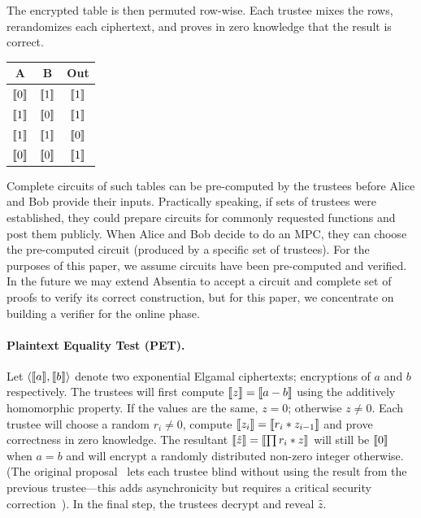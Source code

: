 The encrypted table is then permuted row-wise. Each trustee mixes the rows, rerandomizes each ciphertext, and proves in zero knowledge that the result is correct. 

\begin{center}
\begin{tabular}{|c|c|c|}
  \hline
  A			& 	B			& 	Out   			\\ \hline
  $\llbracket 0 \rrbracket$ 	&	$\llbracket 1 \rrbracket$ 	& 	$\llbracket 1 \rrbracket$ 	\\ \hline
  $\llbracket 1 \rrbracket$ 	&	$\llbracket 0 \rrbracket$ 	&  	$\llbracket 1 \rrbracket$ 	\\ \hline
  $\llbracket 1 \rrbracket$ 	&	$\llbracket 1 \rrbracket$ 	&  	$\llbracket 0 \rrbracket$ 	\\ \hline
  $\llbracket 0 \rrbracket$ 	&	$\llbracket 0 \rrbracket$ 	& 	$\llbracket 1 \rrbracket$ 	\\ \hline
\end{tabular}
\end{center}

Complete circuits of such tables can be pre-computed by the trustees before Alice and Bob provide their inputs. Practically speaking, if sets of trustees were established, they could prepare circuits for commonly requested functions and post them publicly. When Alice and Bob decide to do an MPC, they can choose the pre-computed circuit (produced by a specific set of trustees). For the purposes of this paper, we assume circuits have been pre-computed and verified. In the future we may extend Absentia to accept a circuit and complete set of proofs to verify its correct construction, but for this paper, we concentrate on building a verifier for the online phase.

\paragraph{Plaintext Equality Test (PET).} Let $\left \langle \llbracket a \rrbracket,\llbracket b \rrbracket \right \rangle$ denote two exponential Elgamal ciphertexts; encryptions of $a$ and $b$ respectively. The trustees will first compute $\llbracket z \rrbracket=\llbracket a-b \rrbracket$ using the additively homomorphic property. If the values are the same, $z=0$; otherwise $z\neq 0$. Each trustee will choose a random $r_i\neq0$, compute $\llbracket z_i \rrbracket=\llbracket r_i*z_{i-1} \rrbracket$ and prove correctness in zero knowledge. The resultant $\llbracket \hat{z} \rrbracket=\llbracket \prod r_i*z \rrbracket$ will still be $\llbracket 0 \rrbracket$ when $a=b$ and will encrypt a randomly distributed non-zero integer otherwise. (The original proposal~\cite{JJ00} lets each trustee blind without using the result from the previous trustee---this adds asynchronicity but requires a critical security correction~\cite{mcmurtry2020test}). In the final step, the trustees decrypt and reveal $\hat{z}$.

